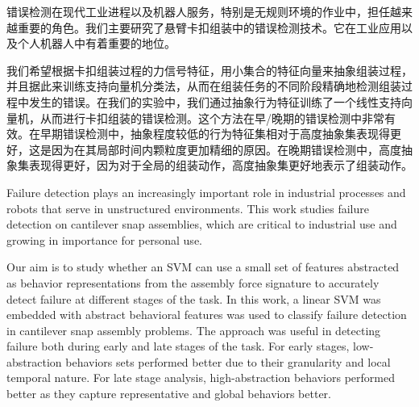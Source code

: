 %

\begin{cabstract}
    错误检测在现代工业进程以及机器人服务，特别是无规则环境的作业中，担任越来越重要的角色。我们主要研究了悬臂卡扣组装中的错误检测技术。它在工业应用以及个人机器人中有着重要的地位。

    \indent 我们希望根据卡扣组装过程的力信号特征，用小集合的特征向量来抽象组装过程，并且据此来训练支持向量机分类法，从而在组装任务的不同阶段精确地检测组装过程中发生的错误。在我们的实验中，我们通过抽象行为特征训练了一个线性支持向量机，从而进行卡扣组装的错误检测。这个方法在早/晚期的错误检测中非常有效。在早期错误检测中，抽象程度较低的行为特征集相对于高度抽象集表现得更好，这是因为在其局部时间内颗粒度更加精细的原因。在晚期错误检测中，高度抽象集表现得更好，因为对于全局的组装动作，高度抽象集更好地表示了组装动作。
    
\end{cabstract}

\begin{eabstract}

    Failure detection plays an increasingly important role in industrial processes and robots that serve in unstructured environments. This work studies failure detection on cantilever snap assemblies, which are critical to industrial use and growing in importance for personal use. 
    
    \indent Our aim is to study whether an SVM can use a small set of features abstracted as behavior representations from the assembly force signature to accurately detect failure at different stages of the task. In this work, a linear SVM was embedded with abstract behavioral features was used to classify failure detection in cantilever snap assembly problems. The approach was useful in detecting failure both during early and late stages of the task. For early stages, low-abstraction behaviors sets performed better due to their granularity and local temporal nature. For late stage analysis, high-abstraction behaviors performed better as they capture representative and global behaviors better.

\end{eabstract}

